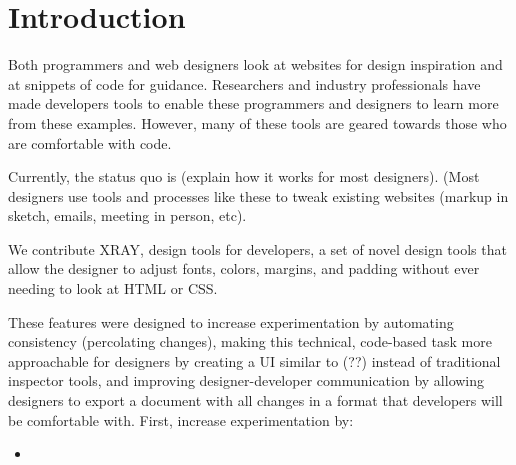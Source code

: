 \documentclass{sigchi-ext}
\begin{document}
\section{Introduction}
Both programmers and web designers look at websites for design inspiration and at snippets of code for guidance. Researchers and industry professionals have made developers tools to enable these programmers and designers to learn more from these examples. However, many of these tools are geared towards those who are comfortable with code. 

Currently, the status quo is (explain how it works for most designers). (Most designers use tools and processes like these to tweak existing websites (markup in sketch, emails, meeting in person, etc). 

We contribute XRAY, design tools for developers, a set of novel design tools that allow the designer to adjust fonts, colors, margins, and padding without ever needing to look at HTML or CSS. 

These features were designed to increase experimentation by automating consistency (percolating changes), making this technical, code-based task more approachable for designers by creating a UI similar to (??) instead of traditional inspector tools, and improving designer-developer communication by allowing designers to export a document with all changes in a format that developers will be comfortable with. 
First, increase experimentation by: 
\begin{itemize}
    \item 
    
    
    
    
\end{itemize}
\end{document}
